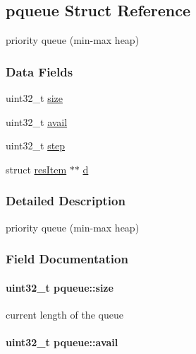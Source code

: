\hypertarget{structpqueue}{
\subsection{pqueue Struct Reference}
\label{structpqueue}
}
priority queue (min-max heap)  


\subsubsection*{Data Fields}
\begin{CompactItemize}
\item 
uint32\_\-t \hyperlink{structpqueue_f548d62a942f23741323c5905e185c1e}{size}
\item 
uint32\_\-t \hyperlink{structpqueue_e9ea5d268464de29da16f4b69128ffe3}{avail}
\item 
uint32\_\-t \hyperlink{structpqueue_9b4b17052da1f1d4a033b47dadf6131c}{step}
\item 
struct \hyperlink{structresItem}{resItem} $\ast$$\ast$ \hyperlink{structpqueue_357464d75571c70914c19cac81f6187f}{d}
\end{CompactItemize}


\subsubsection{Detailed Description}
priority queue (min-max heap) 

\subsubsection{Field Documentation}
\hypertarget{structpqueue_f548d62a942f23741323c5905e185c1e}{
\paragraph[size]{\setlength{\rightskip}{0pt plus 5cm}uint32\_\-t {\bf pqueue::size}}\hfill}
\label{structpqueue_f548d62a942f23741323c5905e185c1e}


current length of the queue \hypertarget{structpqueue_e9ea5d268464de29da16f4b69128ffe3}{
\paragraph[avail]{\setlength{\rightskip}{0pt plus 5cm}uint32\_\-t {\bf pqueue::avail}}\hfill}
\label{structpqueue_e9ea5d268464de29da16f4b69128ffe3}


